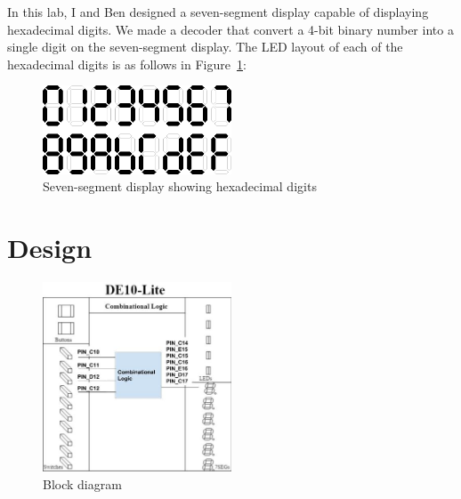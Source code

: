 \documentclass[12pt]{article}
\begin{document}
In this lab, I and Ben designed a seven-segment display capable of displaying hexadecimal digits. We made a decoder that convert a 4-bit binary number into a single digit on the seven-segment display. The LED layout of each of the hexadecimal digits is as follows in Figure~\ref{figure:2}:

\begin{figure}[h]
  \centering
  \includegraphics[width=0.5\textwidth]{seven_segment_hexadecimal.png}
  \caption{Seven-segment display showing hexadecimal digits \cite{EEStackExchangeSevenSegmentHex}}
  \label{figure:2}
\end{figure}

\section{Design}

\begin{figure}[h]
  \centering
  \includegraphics[width=0.5\textwidth]{lab3_block_diagram.png}
  \caption{Block diagram}
  \label{figure:3}
\end{figure}
\end{document}
